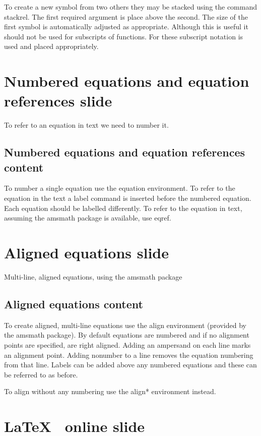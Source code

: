 \documentclass[a4paper,14pt]{extarticle}
\begin{document}
To create a new symbol from two others they may be stacked using the command stackrel. The first required argument is place above the second. The size of the first symbol is automatically adjusted as appropriate. Although this is useful it should not be used for subscripts of functions. For these subscript notation is used and placed appropriately. 

\section{Numbered equations and equation references slide}

To refer to an equation in text we need to number it. 

\subsection{Numbered equations and equation references content}

To number a single equation use the equation environment. To refer to the equation in the text a label command is inserted before the numbered equation. Each equation should be labelled differently. To refer to the equation in text, assuming the amsmath package is available, use eqref. 

\section{Aligned equations slide}

Multi-line, aligned equations, using the amsmath package

\subsection{Aligned equations content}

To create aligned, multi-line equations use the align environment (provided by the amsmath package). By default equations are numbered and if no alignment points are specified, are right aligned. Adding an ampersand on each line marks an alignment point. Adding nonumber to a line removes the equation numbering from that line. Labels can be added above any numbered equations and these can be referred to as before. 

To align without any numbering use the align* environment instead. 

\section{\LaTeX~ online slide}
\end{document}
